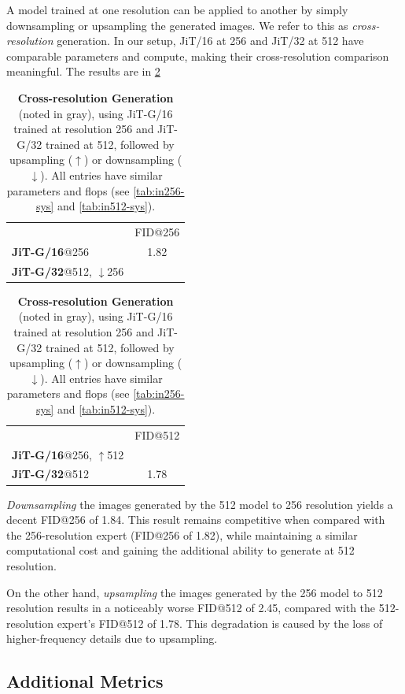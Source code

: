 A model trained at one resolution can be applied to another by simply downsampling or upsampling the generated images. We refer to this as \textit{cross-resolution} generation. In our setup, JiT/16 at 256 and JiT/32 at 512 have comparable parameters and compute, making their cross-resolution comparison meaningful. The results are in \cref{tab:cross}
\begin{table}[h]
\vspace{-.5em}
\centering
{}
\begin{tabular}{l | c }
  & FID@256 \\
\shline
\textbf{JiT-G/16}@256 &  1.82 \\
\textbf{JiT-G/32}@512, $\downarrow$256 & \cellcolor[gray]{.9}{1.84} \\
\end{tabular}
\hspace{1em}
\begin{tabular}{l | c }
  & FID@512 \\
\shline
\textbf{JiT-G/16}@256, $\uparrow$512 & \cellcolor[gray]{.9}{{2.45}} \\
\textbf{JiT-G/32}@512 &  1.78 \\
\end{tabular}


\vspace{-.5em}
\caption{\textbf{Cross-resolution Generation} (noted in gray), using \mbox{JiT-G/16} trained at resolution 256 and JiT-G/32 trained at 512, followed by upsampling ($\uparrow$) or downsampling ($\downarrow$). All entries have similar parameters and flops (see \cref{tab:in256-sys} and \ref{tab:in512-sys}).
}
\label{tab:cross}
\vspace{-.5em}
\end{table}

\textit{Downsampling} the images generated by the 512 model to 256 resolution yields a decent FID@256 of 1.84. 
This result remains competitive when compared with the 256-resolution expert (FID@256 of 1.82), while maintaining a similar computational cost and gaining the additional ability to generate at 512 resolution.

On the other hand, \textit{upsampling} the images generated by the 256 model to 512 resolution results in a noticeably worse FID@512 of 2.45, compared with the 512-resolution expert's FID@512 of 1.78.
This degradation is caused by the loss of higher-frequency details due to upsampling.

\subsection{Additional Metrics}

